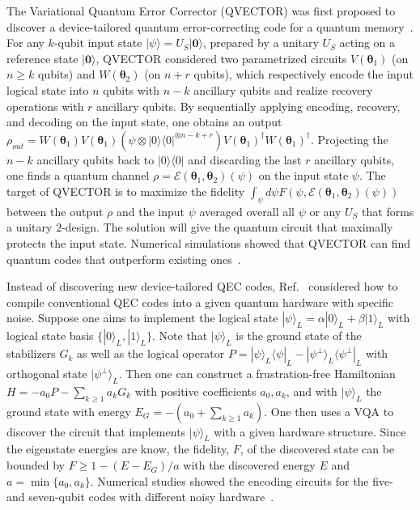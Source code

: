 \documentclass[prx,twocolumn,floatfix,superscriptaddress,longbibliography]{revtex4-1}
\renewcommand{\vec}[1]{\boldsymbol{#1}}  %
\newcommand{\<}{\langle}
\renewcommand{\>}{\rangle}
\newcommand{\ket}[1]{|#1\rangle}               %
\newcommand{\bra}[1]{\langle #1|}              %
\renewcommand{\vec}[1]{\boldsymbol{#1}}  %
\begin{document}
    
The Variational Quantum Error Corrector (QVECTOR) was first proposed to discover a device-tailored quantum error-correcting code for a quantum memory~\cite{johnson2017qvector}. For any $k$-qubit input state $\ket{\psi}=U_S\ket{\vec{0}}$, prepared by a unitary $U_S$ acting on a reference  state $\ket{\vec{0}}$, QVECTOR considered two parametrized circuits $V(\vec\theta_1)$ (on $n\ge k$ qubits) and $W(\vec\theta_2)$ (on $n+r$ qubits), which respectively encode the input logical state into $n$ qubits with $n-k$ ancillary qubits and realize recovery operations with $r$ ancillary qubits.  By sequentially applying encoding, recovery, and decoding on the input state, one obtains  an output $\rho_{out} = W(\vec\theta_1)V(\vec\theta_1)(\psi\otimes \ket{0}\bra{0}^{\otimes n-k+r}) V(\vec\theta_1)^\dag W(\vec\theta_1)^\dag$. Projecting the $n-k$ ancillary qubits back  to $\ket{0}\bra{0}$ and discarding the last $r$ ancillary qubits, one finds a quantum channel $\rho = \mathcal E(\vec\theta_1,\vec\theta_2)(\psi)$ on the input state $\psi$. The target of QVECTOR is to maximize the fidelity $\int_{\psi} d\psi F(\psi, \mathcal E(\vec\theta_1,\vec\theta_2)(\psi))$ between the output $\rho$ and the input $\psi$ averaged overall all $\psi$ or any $U_S$ that forms a unitary $2$-design. The solution will give the quantum circuit that maximally protects the input state. Numerical simulations showed that QVECTOR can find quantum codes that outperform existing ones~\cite{johnson2017qvector}. 
    
    
Instead of discovering new device-tailored QEC codes, Ref.~\cite{xu2019variational} considered how to compile conventional QEC codes into a given quantum hardware with specific noise. Suppose one aims to implement the logical state $\ket{\psi}_L=\alpha\ket{0}_L+\beta\ket{1}_L$ with logical state basis $\{\ket{0}_L,\ket{1}_L\}$. Note that $\ket{\psi}_L$ is the ground state of the stabilizers $G_k$ as well as the logical operator $P=\ket{\psi}_L\bra{\psi}_L - \ket{\psi^{\perp}}_L\bra{\psi^\perp}_L$ with orthogonal state $\ket{\psi^{\perp}}_L$. Then one can construct a frustration-free Hamiltonian $H= - a_0P -\sum_{k\ge 1} a_k G_k$ with positive coefficients $a_0, a_k$, and with $\ket{\psi}_L$  the ground state with energy $E_G=-(a_0+\sum_{k\ge 1} a_k)$. One then uses a VQA to discover the circuit that implements $\ket{\psi}_L$ with a given hardware structure. Since the eigenstate energies are  know, the fidelity, $F$, of the discovered state can be bounded by $F\ge 1-(E-E_G)/a$ with the discovered energy $E$ and $a=\min\{a_0,a_k\}$. Numerical studies showed the encoding circuits for the five- and seven-qubit codes with different noisy hardware~\cite{xu2019variational}.
 
\end{document}

